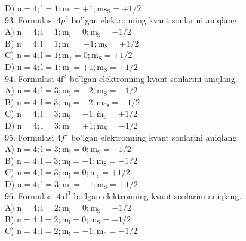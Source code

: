 D) $\mathrm{n}=4 ; \mathrm{l}=1 ; \mathrm{m}_{\mathrm{l}}=+1 ; \mathrm{ms}_{\mathrm{S}}=+1 / 2$\\
93. Formulasi $4 p^{2}$ bo'lgan elektronning kvant sonlarini aniqlang.\\
A) $\mathrm{n}=4 ; \mathrm{l}=1 ; \mathrm{m}_{\mathrm{l}}=0 ; \mathrm{m}_{\mathrm{S}}=-1 / 2$\\
B) $\mathrm{n}=4 ; \mathrm{l}=1 ; \mathrm{m}_{1}=-1 ; \mathrm{m}_{\mathrm{S}}=+1 / 2$\\
C) $\mathrm{n}=4 ; \mathrm{l}=1 ; \mathrm{m}_{1}=0 ; \mathrm{m}_{\mathrm{S}}=+1 / 2$\\
D) $\mathrm{n}=4 ; \mathrm{l}=1 ; \mathrm{m}_{\mathrm{l}}=+1 ; \mathrm{m}_{\mathrm{S}}=+1 / 2$\\
94. Formulasi $4 \mathrm{f}^{9}$ bo'lgan elektronning kvant sonlarini aniqlang.\\
A) $\mathrm{n}=4 ; \mathrm{l}=3 ; \mathrm{m}_{\mathrm{l}}=-2 ; \mathrm{m}_{\mathrm{S}}=-1 / 2$\\
B) $\mathrm{n}=4 ; \mathrm{l}=3 ; \mathrm{m}_{\mathrm{l}}=+2 ; \mathrm{ms}_{\mathrm{s}}=+1 / 2$\\
C) $\mathrm{n}=4 ; \mathrm{l}=3 ; \mathrm{m}_{\mathrm{l}}=-1 ; \dot{\mathrm{m}}_{\mathrm{S}}=+1 / 2$\\
D) $\mathrm{n}=4 ; \mathrm{l}=3 ; \mathrm{m}_{\mathrm{l}}=+1 ; \mathrm{m}_{\mathrm{S}}=-1 / 2$\\
95. Formulasi $4 f^{4}$ bo'lgan elektronning kvant sonlarini aniqlang.\\
A) $\mathrm{n}=4 ; \mathrm{l}=3 ; \mathrm{m}_{\mathrm{l}}=0 ; \mathrm{m}_{\mathrm{S}}=-1 / 2$\\
B) $\mathrm{n}=4 ; \mathrm{l}=3 ; \mathrm{m}_{\mathrm{l}}=-1 ; \mathrm{m}_{\mathrm{S}}=-1 / 2$\\
C) $\mathrm{n}=4 ; \mathrm{l}=3 ; \mathrm{m}_{\mathrm{l}}=0 ; \mathrm{m}_{\mathrm{s}}=+1 / 2$\\
D) $\mathrm{n}=4 ; \mathrm{l}=3 ; \mathrm{m}_{\mathrm{l}}=-1 ; \mathrm{m}_{\mathrm{S}}=+1 / 2$\\
96. Formulasi $4 \mathrm{~d}^{3}$ bo'lgan elektronning kvant sonlarini aniqlang.\\
A) $\mathrm{n}=4 ; \mathrm{l}=2 ; \mathrm{m}_{\mathrm{l}}=0 ; \mathrm{m}_{\mathrm{S}}=-1 / 2$\\
B) $\mathrm{n}=4 ; \mathrm{l}=2 ; \mathrm{m}_{\mathrm{l}}=0 ; \mathrm{m}_{\mathrm{S}}=+1 / 2$\\
C) $\mathrm{n}=4 ; \mathrm{l}=2 ; \mathrm{m}_{\mathrm{l}}=-1 ; \mathrm{m}_{\mathrm{S}}=-1 / 2$\\
